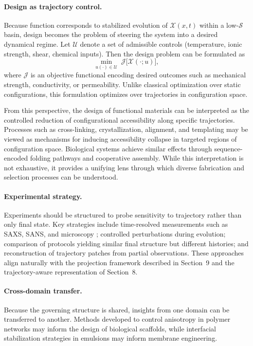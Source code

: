 \documentclass[11pt, a4paper, twocolumn]{article}
\newcommand{\X}{\mathcal{X}}
\newcommand{\Sfield}{\mathcal{S}}
\begin{document}
\paragraph{Design as trajectory control.}
Because function corresponds to stabilized evolution of $\X(x,t)$ within a
low-$\Sfield$ basin, design becomes the problem of steering the system into a
desired dynamical regime. Let $\mathcal{U}$ denote a set of admissible controls
(temperature, ionic strength, shear, chemical inputs). Then the design problem
can be formulated as
\[
    \min_{u(\cdot) \in \mathcal{U}}
    \;
    \mathcal{J}\bigl[\X(\cdot;u)\bigr],
\]
where $\mathcal{J}$ is an objective functional encoding desired outcomes such
as mechanical strength, conductivity, or permeability. Unlike classical
optimization over static configurations, this formulation optimizes over
trajectories in configuration space.

From this perspective, the design of functional materials can be interpreted as
the controlled reduction of configurational accessibility along specific
trajectories. Processes such as cross-linking, crystallization, alignment, and
templating may be viewed as mechanisms for inducing accessibility collapse in
targeted regions of configuration space. Biological systems achieve similar
effects through sequence-encoded folding pathways and cooperative assembly.
While this interpretation is not exhaustive, it provides a unifying lens through
which diverse fabrication and selection processes can be understood.

\paragraph{Experimental strategy.}
Experiments should be structured to probe sensitivity to trajectory rather than
only final state. Key strategies include time-resolved measurements such as SAXS,
SANS, and microscopy \cite{hamley2023,akepati2026}; controlled perturbations
during evolution; comparison of protocols yielding similar final structure but
different histories; and reconstruction of trajectory patches from partial
observations. These approaches align naturally with the projection framework
described in Section~9 and the trajectory-aware representation of Section~8.

\paragraph{Cross-domain transfer.}
Because the governing structure is shared, insights from one domain can be
transferred to another. Methods developed to control anisotropy in polymer
networks may inform the design of biological scaffolds, while interfacial
stabilization strategies in emulsions may inform membrane engineering.
\end{document}
